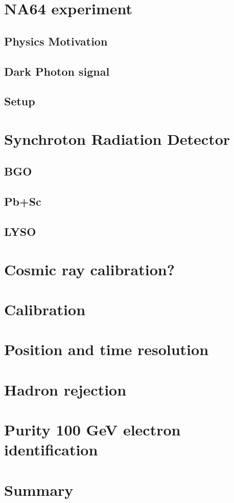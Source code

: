 \section{NA64 experiment}
\subsection{Physics Motivation}
\subsection{Dark Photon signal}
\subsection{Setup}
\section{Synchroton Radiation Detector}
\subsection{BGO}
\subsection{Pb+Sc}
\subsection{LYSO}
\section{Cosmic ray calibration?}
\section{Calibration}
\section{Position and time resolution}
\section{Hadron rejection}
\section{Purity 100 GeV electron identification}
\section{Summary}



